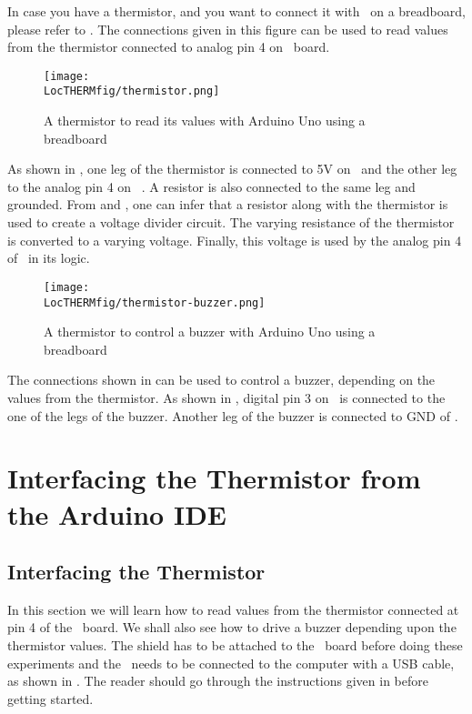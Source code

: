 In case you have a thermistor, and you want to connect it with \arduino\ on a breadboard,
please refer to . The connections given in this figure
can be used to read values from the thermistor connected to analog pin 4 on \arduino\
board.
\begin{figure}
  \centering
  \texttt{[image: \\LocTHERMfig/thermistor.png]}
  \caption{A thermistor to read its values with Arduino Uno using a breadboard}
  \label{fig:ard-therm-bread}
\end{figure}
As shown in , one leg of the thermistor is connected
to 5V on \arduino\ and the other leg to the analog pin 4 on  \arduino. A resistor is also
connected to the same leg and grounded. From \figref{fig:therm-conn} and , one can infer that a resistor
along with the thermistor is used to create a voltage divider circuit. The varying
resistance of the thermistor is converted to a varying voltage. Finally, this voltage is used
by the analog pin 4 of \arduino\ in its logic.

\begin{figure}
  \centering
  \texttt{[image: \\LocTHERMfig/thermistor-buzzer.png]}
  \caption{A thermistor to control a buzzer with Arduino Uno using a breadboard}
  \label{fig:ard-therm-buzzer}
\end{figure}
The connections shown in  can be used to control a buzzer,
depending on the values from the thermistor. As shown in \figref{fig:ard-therm-buzzer},
digital pin 3 on \arduino\ is connected to the one of the legs of the buzzer. Another
leg of the buzzer is connected to GND of \arduino.


\section{Interfacing the Thermistor from the Arduino IDE}
\subsection{Interfacing the Thermistor}
In this section we will learn how to read values from the thermistor
connected at pin 4 of the \arduino\ board. We shall also see how to
drive a buzzer depending upon the thermistor values. The shield has to be attached to the \arduino\ board
before doing these experiments and the \arduino\ needs to be connected to the computer
with a USB cable, as shown in \figref{arduino}. The reader should go through the
instructions given in \secref{sec:ard-start} before getting started.

